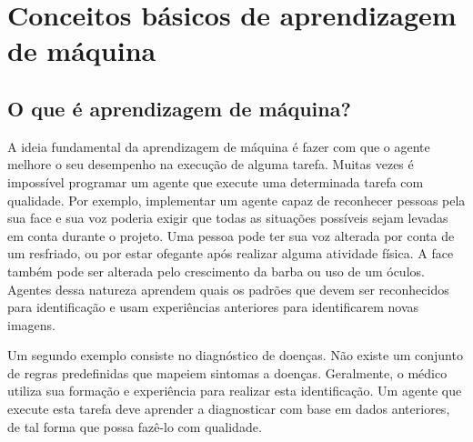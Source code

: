 \chapter{Conceitos básicos de aprendizagem de máquina}
\label{cap:conceitos-basicos-aprendizagem-maquina}


\section{O que é aprendizagem de máquina?}

A ideia fundamental da aprendizagem de máquina é fazer com que o agente melhore o seu desempenho na execução de alguma tarefa. Muitas vezes é impossível programar um agente que execute uma determinada tarefa com qualidade. Por exemplo, implementar um agente capaz de reconhecer pessoas pela sua face e sua voz poderia exigir que todas as situações possíveis sejam levadas em conta durante o projeto. Uma pessoa pode ter sua voz alterada por conta de um resfriado, ou por estar ofegante após realizar alguma atividade física. A face também pode ser alterada pelo crescimento da barba ou uso de um óculos. Agentes dessa natureza aprendem quais os padrões que devem ser reconhecidos para identificação e usam experiências anteriores para identificarem novas imagens.

Um segundo exemplo consiste no diagnóstico de doenças. Não existe um conjunto de regras predefinidas que mapeiem sintomas a doenças. Geralmente, o médico utiliza sua formação e experiência para realizar esta identificação. Um agente que execute esta tarefa deve aprender a diagnosticar com base em dados anteriores, de tal forma que possa fazê-lo com qualidade.

